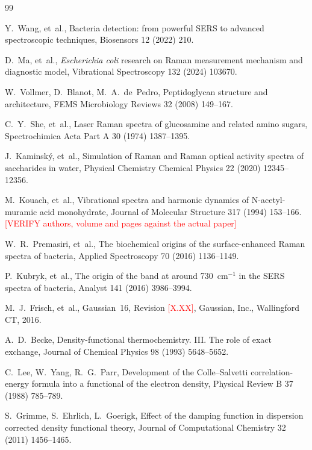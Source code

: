 \documentclass[11pt,a4paper]{article}
\newcommand{\authorcheck}[1]{\textcolor{red}{[#1]}}
\begin{document}
\begin{thebibliography}{99}

Y.~Wang, et~al., Bacteria detection: from powerful SERS to advanced
spectroscopic techniques, Biosensors 12 (2022) 210.

D.~Ma, et~al., \emph{Escherichia coli} research on Raman measurement mechanism
and diagnostic model, Vibrational Spectroscopy 132 (2024) 103670.

W.~Vollmer, D.~Blanot, M.~A.~de~Pedro, Peptidoglycan structure and architecture,
FEMS Microbiology Reviews 32 (2008) 149--167.

C.~Y.~She, et~al., Laser Raman spectra of glucosamine and related amino sugars,
Spectrochimica Acta Part A 30 (1974) 1387--1395.

J.~Kaminsk\'y, et~al., Simulation of Raman and Raman optical activity spectra of
saccharides in water, Physical Chemistry Chemical Physics 22 (2020) 12345--12356.

M.~Kouach, et~al., Vibrational spectra and harmonic dynamics of
N-acetyl-muramic acid monohydrate, Journal of Molecular Structure 317 (1994)
153--166.
\authorcheck{VERIFY authors, volume and pages against the actual paper}

W.~R.~Premasiri, et~al., The biochemical origins of the surface-enhanced Raman
spectra of bacteria, Applied Spectroscopy 70 (2016) 1136--1149.

P.~Kubryk, et~al., The origin of the band at around 730~cm$^{-1}$ in the SERS
spectra of bacteria, Analyst 141 (2016) 3986--3994.

M.~J.~Frisch, et~al., Gaussian~16, Revision \authorcheck{X.XX}, Gaussian, Inc.,
Wallingford CT, 2016.

A.~D.~Becke, Density-functional thermochemistry. III. The role of exact
exchange, Journal of Chemical Physics 98 (1993) 5648--5652.

C.~Lee, W.~Yang, R.~G.~Parr, Development of the Colle--Salvetti
correlation-energy formula into a functional of the electron density, Physical
Review B 37 (1988) 785--789.

S.~Grimme, S.~Ehrlich, L.~Goerigk, Effect of the damping function in dispersion
corrected density functional theory, Journal of Computational Chemistry 32
(2011) 1456--1465.


\end{thebibliography}
\end{document}
